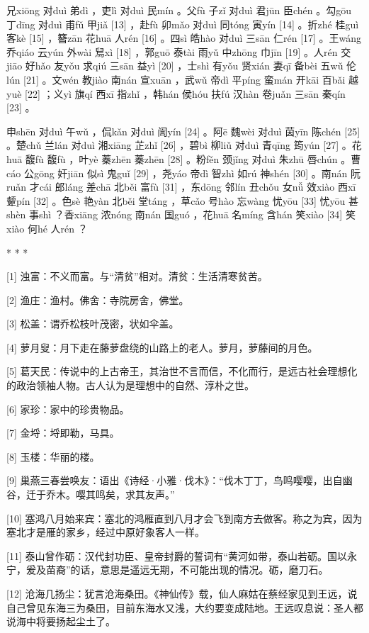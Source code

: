 \documentclass[12pt,UTF8]{ctexbook}
\begin{document}
兄xiōng 对duì 弟dì ，吏lì 对duì 民mín 。父fù 子zǐ 对duì 君jūn 臣chén 。勾gōu 丁dīng 对duì 甫fǔ 甲jiǎ [13] ，赴fù 卯mǎo 对duì 同tóng 寅yín [14] 。折zhé 桂guì 客kè [15] ，簪zān 花huā 人rén [16] 。四sì 皓hào 对duì 三sān 仁rén [17] 。王wáng 乔qiáo 云yún 外wài 舃xì [18] ，郭guō 泰tài 雨yǔ 中zhōng 巾jīn [19] 。人rén 交jiāo 好hǎo 友yǒu 求qiú 三sān 益yì [20] ，士shì 有yǒu 贤xián 妻qī 备bèi 五wǔ 伦lún [21] 。文wén 教jiào 南nán 宣xuān ，武wǔ 帝dì 平píng 蛮mán 开kāi 百bǎi 越yuè [22] ；义yì 旗qí 西xī 指zhǐ ，韩hán 侯hóu 扶fú 汉hàn 卷juǎn 三sān 秦qín [23] 。

申shēn 对duì 午wǔ ，侃kǎn 对duì 訚yín [24] 。阿ē 魏wèi 对duì 茵yīn 陈chén [25] 。楚chǔ 兰lán 对duì 湘xiāng 芷zhǐ [26] ，碧bì 柳liǔ 对duì 青qīng 筠yún [27] 。花huā 馥fù 馥fù ，叶yè 蓁zhēn 蓁zhēn [28] 。粉fěn 颈jǐng 对duì 朱zhū 唇chún 。曹cáo 公gōng 奸jiān 似sì 鬼guǐ [29] ，尧yáo 帝dì 智zhì 如rú 神shén [30] 。南nán 阮ruǎn 才cái 郎láng 差chā 北běi 富fù [31] ，东dōng 邻lín 丑chǒu 女nǚ 效xiào 西xī 颦pín [32] 。色sè 艳yàn 北běi 堂táng ，草cǎo 号hào 忘wàng 忧yōu [33] 忧yōu 甚shèn 事shì ？香xiāng 浓nóng 南nán 国guó ，花huā 名míng 含hán 笑xiào [34] 笑xiào 何hé 人rén ？



* * *



[1] 浊富：不义而富。与“清贫”相对。清贫：生活清寒贫苦。

[2] 渔庄：渔村。佛舍：寺院房舍，佛堂。

[3] 松盖：谓乔松枝叶茂密，状如伞盖。

[4] 萝月叟：月下走在藤萝盘绕的山路上的老人。萝月，萝藤间的月色。

[5] 葛天民：传说中的上古帝王，其治世不言而信，不化而行，是远古社会理想化的政治领袖人物。古人认为是理想中的自然、淳朴之世。

[6] 家珍：家中的珍贵物品。

[7] 金埒：埒即勒，马具。

[8] 玉楼：华丽的楼。

[9] 巢燕三春尝唤友：语出《诗经·小雅·伐木》：“伐木丁丁，鸟鸣嘤嘤，出自幽谷，迁于乔木。嘤其鸣矣，求其友声。”

[10] 塞鸿八月始来宾：塞北的鸿雁直到八月才会飞到南方去做客。称之为宾，因为塞北才是雁的家乡，经过中原好象客人一样。

[11] 泰山曾作砺：汉代封功臣、皇帝封爵的誓词有“黄河如带，泰山若砺。国以永宁，爰及苗裔”的话，意思是遥远无期，不可能出现的情况。砺，磨刀石。

[12] 沧海几扬尘：犹言沧海桑田。《神仙传》载，仙人麻姑在蔡经家见到王远，说自己曾见东海三为桑田，目前东海水又浅，大约要变成陆地。王远叹息说：圣人都说海中将要扬起尘土了。
\end{document}
